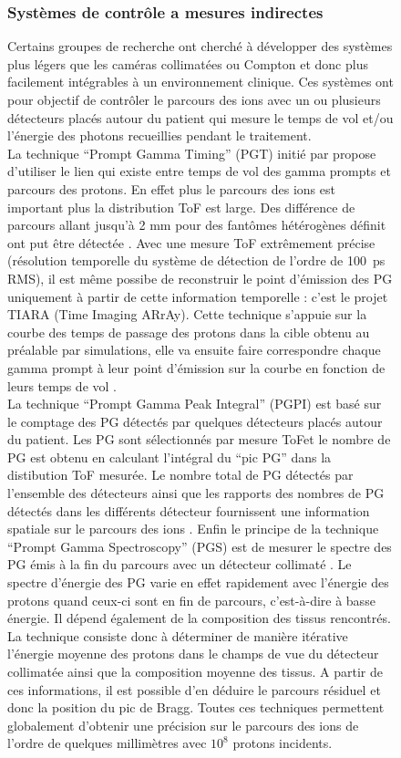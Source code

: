 \documentclass[11pt,a4paper,oldfontcommands]{memoir}
\begin{document}
\begin{figure}
\subsubsection{Systèmes de contrôle a mesures indirectes}
Certains groupes de recherche ont cherché à développer des systèmes plus légers que les caméras collimatées ou Compton et donc plus facilement intégrables à un environnement clinique. Ces systèmes ont pour objectif de contrôler le parcours des ions avec un ou plusieurs détecteurs placés autour du patient qui mesure le temps de vol et/ou l'énergie des photons recueillies pendant le traitement.\\
La technique \enquote{Prompt Gamma Timing} (PGT) initié par \cite{Golnik_2014} propose d'utiliser le lien qui existe entre temps de vol des gamma prompts et parcours des protons. En effet plus le parcours des ions est important plus la distribution ToF est large. Des différence de parcours allant jusqu'à 2 mm pour des fantômes hétérogènes définit ont put être détectée \cite{Hueso_Gonz_lez_2015}. Avec une mesure ToF extrêmement précise (résolution temporelle du système de détection de l'ordre de 100~ps RMS), il est même possibe de reconstruir le point d'émission des PG uniquement à partir de cette information temporelle : c'est le projet TIARA (Time Imaging ARrAy).  Cette technique s'appuie sur la courbe des temps de passage des protons dans la cible obtenu au préalable par simulations, elle va ensuite faire correspondre chaque gamma prompt à leur point d'émission sur la courbe en fonction de leurs temps de vol \cite{Marcatili_2019}.\\
La technique \enquote{Prompt Gamma Peak Integral} (PGPI) est basé sur le comptage des PG détectés par quelques détecteurs placés autour du patient. Les PG sont sélectionnés par mesure ToFet le nombre de PG est obtenu en calculant l'intégral du \enquote{pic PG} dans la distibution ToF mesurée. Le nombre total de PG détectés par l'ensemble des détecteurs ainsi que les rapports des nombres de PG détectés dans les différents détecteur fournissent une information spatiale sur le parcours des ions \cite{KrimmerPGPI}. 
Enfin le principe de la technique \enquote{Prompt Gamma Spectroscopy} (PGS) est de mesurer le spectre des PG émis à la fin du parcours avec un détecteur collimaté \cite{Testa_2014}. Le spectre d’énergie des PG varie en effet rapidement avec l’énergie des protons quand ceux-ci sont en fin de parcours, c’est-à-dire à basse énergie. Il dépend également de la composition des tissus rencontrés. La technique consiste donc à déterminer de manière itérative l’énergie moyenne des protons dans le champs de vue du détecteur collimatée ainsi que la composition moyenne des tissus. A partir de ces informations, il est possible d’en déduire le parcours résiduel et donc la position du pic de Bragg. Toutes ces techniques permettent globalement d’obtenir une précision sur le parcours des ions de l’ordre de quelques millimètres avec $10^8$ protons incidents.


\end{figure}
\end{document}
